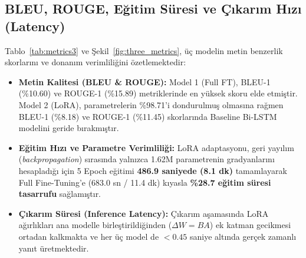 \documentclass[conference]{IEEEtran}
\begin{document}
\subsection{BLEU, ROUGE, Eğitim Süresi ve Çıkarım Hızı (Latency)}
Tablo~\ref{tab:metrics3} ve Şekil~\ref{fig:three_metrics}, üç modelin metin benzerlik skorlarını ve donanım verimliliğini özetlemektedir:
\begin{itemize}
    \item \textbf{Metin Kalitesi (BLEU \& ROUGE):} Model 1 (Full FT), BLEU-1 (\%10.60) ve ROUGE-1 (\%15.89) metriklerinde en yüksek skoru elde etmiştir. Model 2 (LoRA), parametrelerin \%98.71'i dondurulmuş olmasına rağmen BLEU-1 (\%8.18) ve ROUGE-1 (\%11.45) skorlarında Baseline Bi-LSTM modelini geride bırakmıştır.
    \item \textbf{Eğitim Hızı ve Parametre Verimliliği:} LoRA adaptasyonu, geri yayılım (\textit{backpropagation}) sırasında yalnızca 1.62M parametrenin gradyanlarını hesapladığı için 5 Epoch eğitimi \textbf{486.9 saniyede (8.1 dk)} tamamlayarak Full Fine-Tuning'e (683.0 sn / 11.4 dk) kıyasla \textbf{\%28.7 eğitim süresi tasarrufu} sağlamıştır.
    \item \textbf{Çıkarım Süresi (Inference Latency):} Çıkarım aşamasında LoRA ağırlıkları ana modelle birleştirildiğinden ($\Delta W = BA$) ek katman gecikmesi ortadan kalkmakta ve her üç model de $<0.45$ saniye altında gerçek zamanlı yanıt üretmektedir.
\end{itemize}
\end{document}
